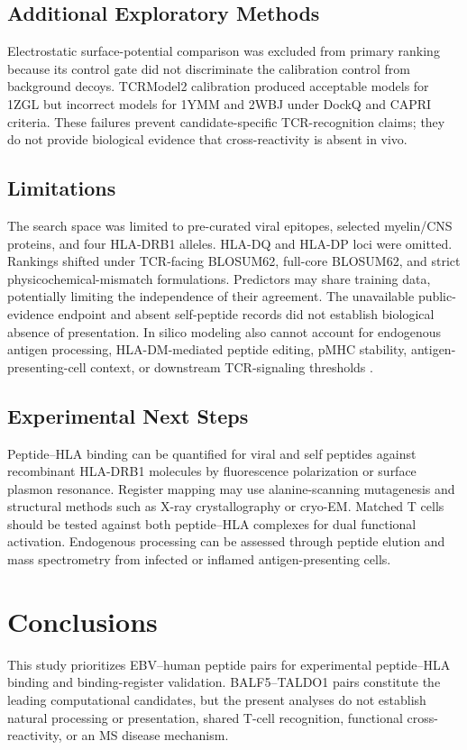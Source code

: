 \documentclass[11pt]{article}
\begin{document}
\subsection{Additional Exploratory Methods}
Electrostatic surface-potential comparison was excluded from primary ranking because its control gate did not discriminate the calibration control from background decoys. TCRModel2 calibration produced acceptable models for 1ZGL but incorrect models for 1YMM and 2WBJ under DockQ and CAPRI criteria. These failures prevent candidate-specific TCR-recognition claims; they do not provide biological evidence that cross-reactivity is absent in vivo.

\subsection{Limitations}
The search space was limited to pre-curated viral epitopes, selected myelin/CNS proteins, and four HLA-DRB1 alleles. HLA-DQ and HLA-DP loci were omitted. Rankings shifted under TCR-facing BLOSUM62, full-core BLOSUM62, and strict physicochemical-mismatch formulations. Predictors may share training data, potentially limiting the independence of their agreement. The unavailable public-evidence endpoint and absent self-peptide records did not establish biological absence of presentation. In silico modeling also cannot account for endogenous antigen processing, HLA-DM-mediated peptide editing, pMHC stability, antigen-presenting-cell context, or downstream TCR-signaling thresholds \cite{denzin}.

\subsection{Experimental Next Steps}
Peptide--HLA binding can be quantified for viral and self peptides against recombinant HLA-DRB1 molecules by fluorescence polarization or surface plasmon resonance. Register mapping may use alanine-scanning mutagenesis and structural methods such as X-ray crystallography or cryo-EM. Matched T cells should be tested against both peptide--HLA complexes for dual functional activation. Endogenous processing can be assessed through peptide elution and mass spectrometry from infected or inflamed antigen-presenting cells.

\section{Conclusions}
This study prioritizes EBV--human peptide pairs for experimental peptide--HLA binding and binding-register validation. BALF5--TALDO1 pairs constitute the leading computational candidates, but the present analyses do not establish natural processing or presentation, shared T-cell recognition, functional cross-reactivity, or an MS disease mechanism.
\end{document}
